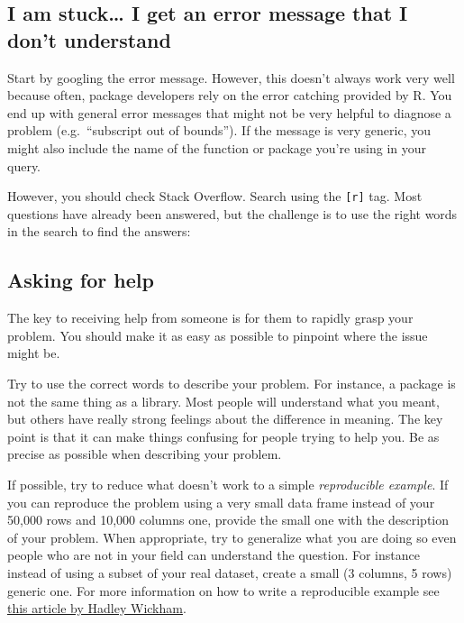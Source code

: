 \documentclass[
]{book}
\begin{document}
\subsection*{I am stuck\ldots{} I get an error message that I don't understand}\label{i-am-stuck-i-get-an-error-message-that-i-dont-understand}

Start by googling the error message. However, this doesn't always work very well because often, package developers rely on the error catching provided by R. You end up with general error messages that might not be very helpful to diagnose a problem (e.g.~``subscript out of bounds''). If the message is very generic, you might also include the name of the function or package you're using in your query.

However, you should check Stack Overflow. Search using the \texttt{{[}r{]}} tag. Most questions have already been answered, but the challenge is to use the right words in the search to find the answers: \href{http://stackoverflow.com/questions/tagged/r}{}

\subsection*{Asking for help}\label{asking-for-help}

The key to receiving help from someone is for them to rapidly grasp your problem. You should make it as easy as possible to pinpoint where the issue might be.

Try to use the correct words to describe your problem. For instance, a package is not the same thing as a library. Most people will understand what you meant, but others have really strong feelings about the difference in meaning. The key point is that it can make things confusing for people trying to help you. Be as precise as possible when describing your problem.

If possible, try to reduce what doesn't work to a simple \emph{reproducible example}. If you can reproduce the problem using a very small data frame instead of your 50,000 rows and 10,000 columns one, provide the small one with the description of your problem. When appropriate, try to generalize what you are doing so even people who are not in your field can understand the question. For instance instead of using a subset of your real dataset, create a small (3 columns, 5 rows) generic one. For more information on how to write a reproducible example see \href{\%22http://adv-r.had.co.nz/Reproducibility.html\%22}{this article by Hadley Wickham}.
\end{document}
